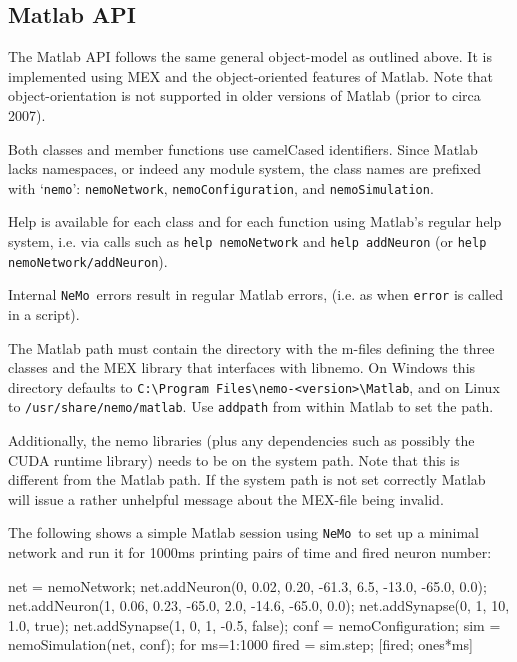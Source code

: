 \documentclass[a4paper]{article}
\newcommand{\nemo}{\texttt{NeMo}}
\newcommand{\code}[1]{\texttt{#1}}
\newcommand{\file}[1]{\texttt{#1}}
\begin{document}


\newpage

\subsection{Matlab API}
\label{api:matlab}

The Matlab API follows the same general object-model as outlined above.
It is implemented using MEX and the object-oriented features of Matlab. 
Note that object-orientation is not supported in older versions of Matlab (prior to circa 2007).

Both classes and member functions use camelCased identifiers.
Since Matlab lacks namespaces, or indeed any module system,
	the class names are prefixed with `\code{nemo}':
	\code{nemoNetwork}, \code{nemoConfiguration}, and \code{nemoSimulation}.


Help is available for each class and for each function using Matlab's regular help system,
	i.e. via calls such as
		\code{help nemoNetwork} 
		and \code{help addNeuron} (or \code{help nemoNetwork/addNeuron}).

Internal \nemo\ errors result in regular Matlab errors,
	(i.e. as when \code{error} is called in a script).

The Matlab path must contain the directory with the m-files
	defining the three classes and the MEX library that interfaces with libnemo.
On Windows this directory defaults to \file{C:\textbackslash Program Files\textbackslash nemo-<version>\textbackslash Matlab},
and on Linux to \file{/usr/share/nemo/matlab}.
Use \code{addpath} from within Matlab to set the path.

Additionally, the nemo libraries (plus any dependencies such as possibly the CUDA runtime library)
	needs to be on the system path.
Note that this is different from the Matlab path.
If the system path is not set correctly Matlab will issue a rather unhelpful message about the MEX-file being invalid.

The following shows a simple Matlab session using \nemo\ to set up a minimal
network and run it for 1000ms printing pairs of time and fired neuron number:

\begin{matlab}
net = nemoNetwork;
net.addNeuron(0, 0.02, 0.20, -61.3, 6.5, -13.0, -65.0, 0.0);
net.addNeuron(1, 0.06, 0.23, -65.0, 2.0, -14.6, -65.0, 0.0);
net.addSynapse(0, 1, 10, 1.0, true);
net.addSynapse(1, 0, 1, -0.5, false);
conf = nemoConfiguration;
sim = nemoSimulation(net, conf);
for ms=1:1000 
	fired = sim.step;
	[fired; ones*ms]
\end{matlab}
\end{document}
